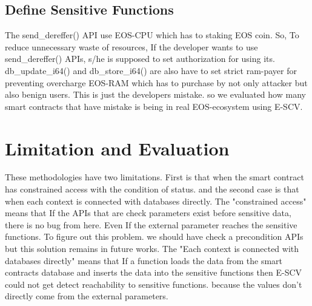 \subsection{Define Sensitive Functions}
The send\_dereffer() API use EOS-CPU which has to staking EOS coin. So, To reduce unnecessary waste of resources, If the developer wants to use send\_dereffer() APIs, s/he is supposed to set authorization for using its. db\_update\_i64() and db\_store\_i64() are also have to set strict ram-payer for preventing overcharge EOS-RAM which has to purchase by not only attacker but also benign users. This is just the developers mistake. so we evaluated how many smart contracts that have mistake is being in real EOS-ecosystem using E-SCV.

\section{Limitation and Evaluation}



These methodologies have two limitations. First is that when the smart contract has constrained access with the condition of status. and the second case is that when each context is connected with databases directly. 
The "constrained access" means that If the APIs that are check parameters exist before sensitive data, there is no bug from here. Even If the external parameter reaches the sensitive functions. To figure out this problem. we should have check a precondition APIs but this solution remains in future works.
The "Each context is connected with databases directly" means that If a function loads the data from the smart contracts database and inserts the data into the sensitive functions then E-SCV could not get detect reachability to sensitive functions. because the values don't directly come from the external parameters. 


